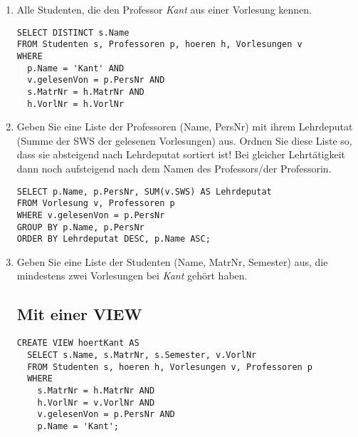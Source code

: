 \documentclass{lehramt-informatik-aufgabe}
\begin{document}
\begin{enumerate}


\item Alle Studenten, die den Professor \emph{Kant} aus einer Vorlesung
kennen.

\begin{liAntwort}
\begin{verbatim}
SELECT DISTINCT s.Name
FROM Studenten s, Professoren p, hoeren h, Vorlesungen v
WHERE
  p.Name = 'Kant' AND
  v.gelesenVon = p.PersNr AND
  s.MatrNr = h.MatrNr AND
  h.VorlNr = h.VorlNr
\end{verbatim}
\end{liAntwort}


\item Geben Sie eine Liste der Professoren (Name, PersNr) mit ihrem
Lehrdeputat (Summe der SWS der gelesenen Vorlesungen) aus. Ordnen Sie
diese Liste so, dass sie absteigend nach Lehrdeputat sortiert ist! Bei
gleicher Lehrtätigkeit dann noch aufsteigend nach dem Namen des
Professors/der Professorin.

\begin{liAntwort}
\begin{verbatim}
SELECT p.Name, p.PersNr, SUM(v.SWS) AS Lehrdeputat
FROM Vorlesung v, Professoren p
WHERE v.gelesenVon = p.PersNr
GROUP BY p.Name, p.PersNr
ORDER BY Lehrdeputat DESC, p.Name ASC;
\end{verbatim}
\end{liAntwort}


\item Geben Sie eine Liste der Studenten (Name, MatrNr, Semester) aus,
die mindestens zwei Vorlesungen bei \emph{Kant} gehört haben.

\begin{liAntwort}
\subsection*{Mit einer VIEW}

\begin{verbatim}
CREATE VIEW hoertKant AS
  SELECT s.Name, s.MatrNr, s.Semester, v.VorlNr
  FROM Studenten s, hoeren h, Vorlesungen v, Professoren p
  WHERE
    s.MatrNr = h.MatrNr AND
    h.VorlNr = v.VorlNr AND
    v.gelesenVon = p.PersNr AND
    p.Name = 'Kant';
\end{verbatim}


\end{liAntwort}
\end{enumerate}
\end{document}
